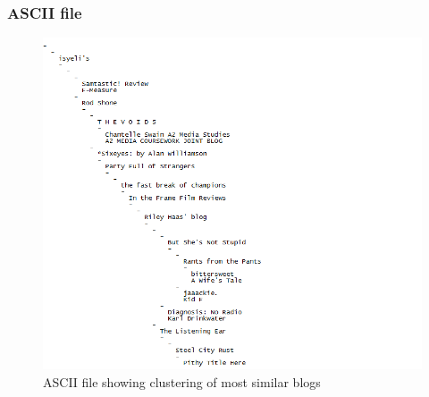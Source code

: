 \subsubsection{ASCII file}
\begin{figure}[ht]    
    \begin{center}
        \includegraphics[scale=0.8]{sample_ascii_2.png}
        \caption{ASCII file showing clustering of most similar blogs}
        \label{Samplet2}
    \end{center}
\end{figure}
\newpage
